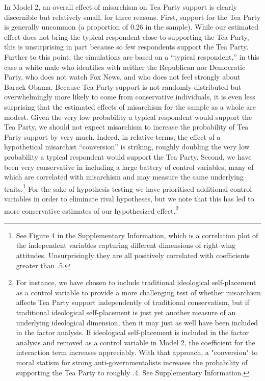 \documentclass[12pt,]{article}
\let\rmarkdownfootnote\footnote%
\def\footnote{\protect\rmarkdownfootnote}
\begin{document}
In Model 2, an overall effect of misarchism on Tea Party support is
clearly discernible but relatively small, for three reasons. First,
support for the Tea Party is generally uncommon (a proportion of 0.26 in
the sample). While our estimated effect does not bring the typical
respondent close to supporting the Tea Party, this is unsurprising in
part because so few respondents support the Tea Party. Further to this
point, the simulations are based on a ``typical respondent,'' in this
case a white male who identifies with neither the Republican nor
Democratic Party, who does not watch Fox News, and who does not feel
strongly about Barack Obama. Because Tea Party support is not randomly
distributed but overwhelmingly more likely to come from conservative
individuals, it is even less surprising that the estimated effects of
misarchism for the sample as a whole are modest. Given the very low
probability a typical respondent would support the Tea Party, we should
not expect misarchism to increase the probability of Tea Party support
by very much. Indeed, in relative terms, the effect of a hypothetical
misarchist ``conversion'' is striking, roughly doubling the very low
probability a typical respondent would support the Tea Party. Second, we
have been very conservative in including a large battery of control
variables, many of which are correlated with misarchism and may measure
the same underlying
traits.\footnote{See Figure 4 in the Supplementary Information, which is a correlation plot of the independent variables capturing different dimensions of right-wing attitudes. Unsurprisingly they are all positively correlated with coefficients greater than .5.}
For the sake of hypothesis testing we have prioritised additional
control variables in order to eliminate rival hypotheses, but we note
that this has led to more conservative estimates of our hypothesized
effect.\footnote{For instance, we have chosen to include traditional ideological self-placement as a control variable to provide a more challenging test of whether misarchism affects Tea Party support independently of traditional conservatism, but if traditional ideological self-placement is just yet another measure of an underlying ideological dimension, then it may just as well have been included in the factor analysis. If ideological self-placement is included in the factor analysis and removed as a control variable in Model 2, the coefficient for the interaction term increases appreciably. With that approach, a "conversion" to moral statism for strong anti-governmentalists increases the probability of supporting the Tea Party to roughly .4. See Supplementary Information.}
\end{document}
